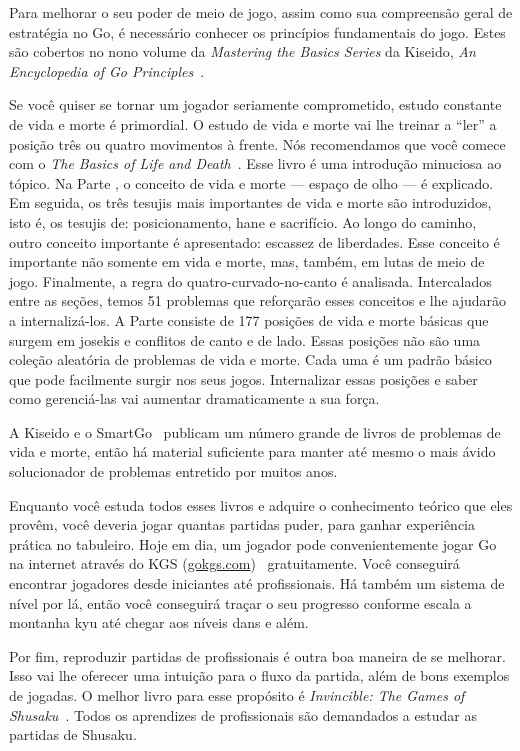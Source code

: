 Para melhorar o seu poder de meio de jogo, assim como sua compreensão geral de estratégia no Go, é necessário conhecer os princípios fundamentais do jogo. Estes são cobertos no nono volume da \emph{Mastering the Basics Series} da Kiseido, \emph{An Encyclopedia of Go Principles}~\cite{bozulich_encyclopedia_principles}.

Se você quiser se tornar um jogador seriamente comprometido, estudo constante de vida e morte é primordial. O estudo de vida e morte vai lhe treinar a ``ler'' a posição três ou quatro movimentos à frente. Nós recomendamos que você comece com o \emph{The Basics of Life and Death}~\cite{zeijst_bozulich_basics_of_life_and_death}. Esse livro é uma introdução minuciosa ao tópico. Na Parte , o conceito de vida e morte --- espaço de olho --- é explicado. Em seguida, os três tesujis mais importantes de vida e morte são introduzidos, isto é, os tesujis de: posicionamento, hane e sacrifício. Ao longo do caminho, outro conceito importante é apresentado: escassez de liberdades. Esse conceito é importante não somente em vida e morte, mas, também, em lutas de meio de jogo. Finalmente, a regra do quatro-curvado-no-canto é analisada. Intercalados entre as seções, temos 51 problemas que reforçarão esses conceitos e lhe ajudarão a internalizá-los. A Parte  consiste de 177 posições de vida e morte básicas que surgem em josekis e conflitos de canto e de lado. Essas posições não são uma coleção aleatória de problemas de vida e morte. Cada uma é um padrão básico que pode facilmente surgir nos seus jogos. Internalizar essas posições e saber como gerenciá-las vai aumentar dramaticamente a sua força.

A Kiseido e o SmartGo~\cite{smartgo} publicam um número grande de livros de problemas de vida e morte, então há material suficiente para manter até mesmo o mais ávido solucionador de problemas entretido por muitos anos.

Enquanto você estuda todos esses livros e adquire o conhecimento teórico que eles provêm, você deveria jogar quantas partidas puder, para ganhar experiência prática no tabuleiro. Hoje em dia, um jogador pode convenientemente jogar Go na internet através do KGS (\href{https://www.gokgs.com}{gokgs.com})~\cite{kgs} gratuitamente. Você conseguirá encontrar jogadores desde iniciantes até profissionais. Há também um sistema de nível por lá, então você conseguirá traçar o seu progresso conforme escala a montanha kyu até chegar aos níveis dans e além.

Por fim, reproduzir partidas de profissionais é outra boa maneira de se melhorar. Isso vai lhe oferecer uma intuição para o fluxo da partida, além de bons exemplos de jogadas. O melhor livro para esse propósito é \emph{Invincible: The Games of Shusaku}~\cite{power_invincible}. Todos os aprendizes de profissionais são demandados a estudar as partidas de Shusaku.